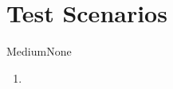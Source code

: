 \chapter{Test Scenarios} \label{chp:test-scenarios}
	\begin{testcase}{}{Medium}{None}
		{
			\textbf{}
		}
		{
			\begin{enumerate}
				\item 
			\end{enumerate}
		}
	\end{testcase}